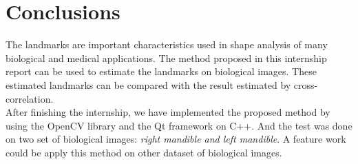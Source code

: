 \section{Conclusions}
The landmarks are important characteristics used in shape analysis of many biological and medical applications. The method proposed in this internship report can be used to estimate the landmarks on biological images. These estimated landmarks can be compared with the result estimated by cross-correlation.\\[0.2cm]
After finishing the internship, we have implemented the proposed method by using the OpenCV library and the Qt framework on C++. And the test was done on two set of biological images: \textit{right mandible and left mandible}. A feature work could be apply this method on other dataset of biological images.


